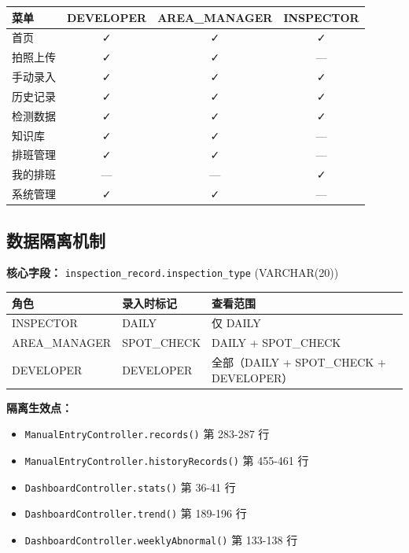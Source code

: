 \documentclass[12pt,a4paper]{ctexart}
\begin{document}
\begin{table}[h]
\centering
\begin{tabular}{|l|c|c|c|}
\hline
\textbf{菜单} & \textbf{DEVELOPER} & \textbf{AREA\_MANAGER} & \textbf{INSPECTOR} \\
\hline
首页 & ✓ & ✓ & ✓ \\
拍照上传 & ✓ & ✓ & — \\
手动录入 & ✓ & ✓ & ✓ \\
历史记录 & ✓ & ✓ & ✓ \\
检测数据 & ✓ & ✓ & ✓ \\
知识库 & ✓ & ✓ & — \\
排班管理 & ✓ & ✓ & — \\
我的排班 & — & — & ✓ \\
系统管理 & ✓ & ✓ & — \\
\hline
\end{tabular}
\end{table}

\subsection{数据隔离机制}

\textbf{核心字段：} \texttt{inspection\_record.inspection\_type} (VARCHAR(20))

\begin{table}[h]
\centering
\begin{tabular}{|l|l|l|}
\hline
\textbf{角色} & \textbf{录入时标记} & \textbf{查看范围} \\
\hline
INSPECTOR & DAILY & 仅 DAILY \\
AREA\_MANAGER & SPOT\_CHECK & DAILY + SPOT\_CHECK \\
DEVELOPER & DEVELOPER & 全部（DAILY + SPOT\_CHECK + DEVELOPER） \\
\hline
\end{tabular}
\end{table}

\textbf{隔离生效点：}
\begin{itemize}
    \item \texttt{ManualEntryController.records()} 第 283-287 行
    \item \texttt{ManualEntryController.historyRecords()} 第 455-461 行
    \item \texttt{DashboardController.stats()} 第 36-41 行
    \item \texttt{DashboardController.trend()} 第 189-196 行
    \item \texttt{DashboardController.weeklyAbnormal()} 第 133-138 行
\end{itemize}
\end{document}
